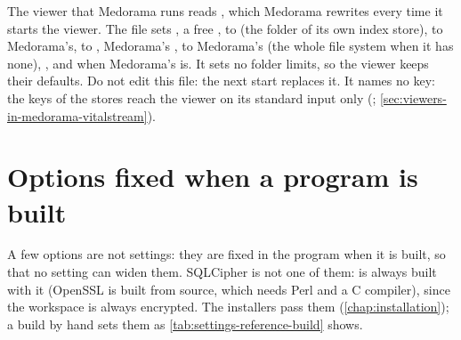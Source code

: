 The viewer that Medorama runs reads , which Medorama
rewrites every time it starts the viewer. The file sets , a free
,  to  (the folder of its own index store),  to
Medorama's,  to , Medorama's ,
 to Medorama's (the whole file system when it has none),
, and  when Medorama's
 is. It sets no folder limits, so the viewer keeps their defaults. Do not edit
this file: the next start replaces it. It names no key: the keys of the stores reach the viewer on
its standard input only (; \cref{sec:viewers-in-medorama-vitalstream}).

\section{Options fixed when a program is built}
\label{sec:settings-reference-build}

A few options are not settings: they are fixed in the program when it is built, so that no
setting can widen them. SQLCipher is not one of them:  is always built with it
(OpenSSL is built from source, which needs Perl and a C compiler), since the workspace is always
encrypted. The installers pass them (\cref{chap:installation}); a build by hand sets
them as \cref{tab:settings-reference-build} shows.

